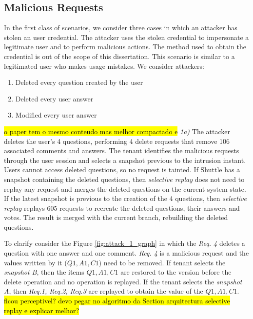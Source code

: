 \subsection{Malicious Requests}\label{sec:eval:accuracy:requests}
In the first class of scenarios, we consider three cases in which an attacker has stolen an user credential. The attacker uses the stolen credential to impersonate a legitimate user and to perform malicious actions. The method used to obtain the credential is out of the scope of this dissertation. This scenario is similar to a legitimated user who makes usage mistakes.
We consider attackers:

\begin{enumerate}[label=\alph*]
  \item Deleted every question created by the user
  \item Deleted every user answer
  \item Modified every user answer
\end{enumerate}


\hl{o paper tem o mesmo conteudo mas melhor compactado e }
\textit{1a)} 
The attacker deletes the user's 4 questions, performing 4 delete requests that remove 106 associated comments and answers. 
The tenant identifies the malicious requests through the user session and selects a snapshot previous to the intrusion instant. Users cannot access deleted questions, so no request is tainted. 
If Shuttle has a snapshot containing the deleted questions, then \textit{selective replay} does not need to replay any request and merges the deleted questions on the current system state. If the latest snapshot is previous to the creation of the 4 questions, then \textit{selective replay} replays 605 requests to recreate the deleted questions, their answers and votes. The result is merged with the current branch, rebuilding the deleted questions. 

To clarify consider the Figure \ref{fig:attack_1_graph} in which the \emph{Req. 4} deletes a question with one answer and one comment. \emph{Req. 4} is a malicious request and the values written by it ($Q1, A1, C1$) need to be removed. If tenant selects the \emph{snapshot B}, then the items $Q1, A1, C1$ are restored to the version before the delete operation and no operation is replayed. If the tenant selects the \emph{snapshot A}, then \emph{Req.1, Req.2, Req.3} are replayed to obtain the value of the $Q1, A1, C1$. \hl{ficou perceptivel? devo pegar no algoritmo da Section arquitectura selective replay e explicar melhor? }

